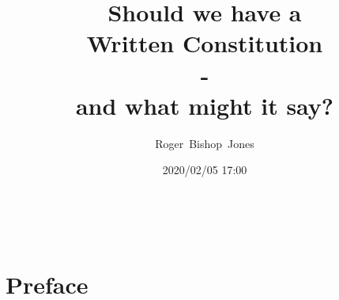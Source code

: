 \documentclass[14pt,titlepage]{extarticle}
\title{\LARGE \bf Should we have a \\Written Constitution \\- \\and what might it say?}
\author{Roger~Bishop~Jones}
\date{\small 2020/02/05 17:00}
\newcommand{\ignore}[1]{}
\begin{document}

                               
\begin{titlepage}
  \maketitle
  
 



 

\end{titlepage}

\ \

\ignore{
\begin{centering}
{\LARGE \bf Should we have a \\Written Constitution?\\ - \\and what might it say?\\}
\end{centering}
}%

\setcounter{tocdepth}{2}
{\parskip-0pt\tableofcontents}




\section*{Preface}
\end{document}
